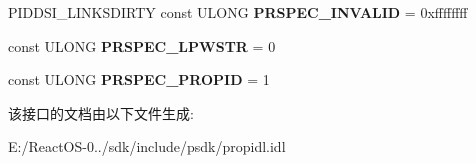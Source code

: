 \begin{DoxyCompactItemize}
\item 
\mbox{\label{interface_i_property_storage_a37b7d840bd00dda061b547aabb19e2ba}} 
P\+I\+D\+D\+S\+I\+\_\+\+L\+I\+N\+K\+S\+D\+I\+R\+TY const U\+L\+O\+NG {\bfseries P\+R\+S\+P\+E\+C\+\_\+\+I\+N\+V\+A\+L\+ID} = 0xffffffff
\item 
\mbox{\label{interface_i_property_storage_aa5e6907666c24fc26463f1dc7a06d6ec}} 
const U\+L\+O\+NG {\bfseries P\+R\+S\+P\+E\+C\+\_\+\+L\+P\+W\+S\+TR} = 0
\item 
\mbox{\label{interface_i_property_storage_a5e5ca2751e0a0b462c11f01b6352cd6f}} 
const U\+L\+O\+NG {\bfseries P\+R\+S\+P\+E\+C\+\_\+\+P\+R\+O\+P\+ID} = 1
\end{DoxyCompactItemize}


该接口的文档由以下文件生成\+:\begin{DoxyCompactItemize}
\item 
E\+:/\+React\+O\+S-\/0../sdk/include/psdk/propidl.\+idl\end{DoxyCompactItemize}
